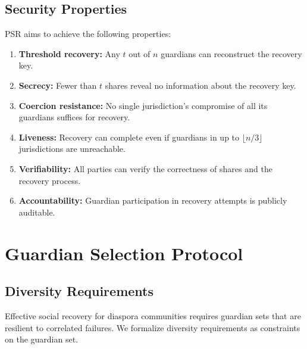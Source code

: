 \documentclass[11pt,a4paper,twocolumn]{article}
\begin{document}
\subsection{Security Properties}

PSR aims to achieve the following properties:

\begin{enumerate}[label=\textbf{P\arabic*}]
  \item \textbf{Threshold recovery:} Any $t$ out of $n$ guardians can reconstruct the recovery key.
  \item \textbf{Secrecy:} Fewer than $t$ shares reveal no information about the recovery key.
  \item \textbf{Coercion resistance:} No single jurisdiction's compromise of all its guardians suffices for recovery.
  \item \textbf{Liveness:} Recovery can complete even if guardians in up to $\lfloor n/3 \rfloor$ jurisdictions are unreachable.
  \item \textbf{Verifiability:} All parties can verify the correctness of shares and the recovery process.
  \item \textbf{Accountability:} Guardian participation in recovery attempts is publicly auditable.
\end{enumerate}

\section{Guardian Selection Protocol}\label{sec:guardian}

\subsection{Diversity Requirements}

Effective social recovery for diaspora communities requires guardian sets that are resilient to correlated failures. We formalize diversity requirements as constraints on the guardian set.
\end{document}

